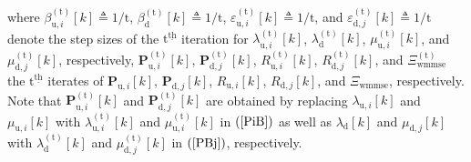 \documentclass[10pt,journal]{IEEEtran}
\newcommand{\paren}[1]{\left({#1}\right)}
\newcommand{\bracket}[1]{{\left [{#1}\right ]}}
\newcommand{\ith}[1]    {{#1}^{\underline{\text{th}}}}
\newcommand{\PiB}{\mathbf{P}_{\textrm{u},i}\bracket{k}}
\newcommand{\PBj}{\mathbf{P}_{\textrm{d},j}\bracket{k}}
\newcommand{\sfrac}[2]{#1/#2}
\theoremstyle{definition}
\begin{document}
where $\beta^{\paren{\mathrm{t}}}_{\textrm{u},i}\bracket{k}\triangleq\sfrac{1}{\mathrm{t}}$, $\beta^{\paren{\mathrm{t}}}_{\textrm{d}}\bracket{k}\triangleq\sfrac{1}{\mathrm{t}}$, $\varepsilon^{\paren{\mathrm{t}}}_{\textrm{u},i}\bracket{k}\triangleq\sfrac{1}{\mathrm{t}}$, and $\varepsilon^{\paren{\mathrm{t}}}_{\textrm{d},j}\bracket{k}\triangleq\sfrac{1}{\mathrm{t}}$ denote the step sizes of the $\ith{\mathrm{t}}$ iteration for $\lambda^{\paren{\mathrm{t}}}_{\textrm{u},i}\bracket{k}$, $\lambda^{\paren{\mathrm{t}}}_{\textrm{d}}\bracket{k}$, $\mu^{\paren{\mathrm{t}}}_{\textrm{u},i}\bracket{k}$, and $\mu^{\paren{\mathrm{t}}}_{\textrm{d},j}\bracket{k}$, respectively, $\mathbf{P}^{\paren{\mathrm{t}}}_{\textrm{u},i}\bracket{k}$, $\mathbf{P}^{\paren{\mathrm{t}}}_{\textrm{d},j}\bracket{k}$, $\mathit{R}^{\paren{\mathrm{t}}}_{\textrm{u},i}\bracket{k}$, $\mathit{R}^{\paren{\mathrm{t}}}_{\textrm{d},j}\bracket{k}$, and $\Xi^{\paren{\mathrm{t}}}_{\textrm{wmmse}}$ the $\ith{\mathrm{t}}$ iterates of $\PiB$, $\PBj$, $\mathit{R}_{\textrm{u},i}\bracket{k}$, $\mathit{R}_{\textrm{d},j}\bracket{k}$, and $\Xi_{\textrm{wmmse}}$, respectively. Note that $\mathbf{P}^{\paren{\mathrm{t}}}_{\textrm{u},i}\bracket{k}$ and $\mathbf{P}^{\paren{\mathrm{t}}}_{\textrm{d},j}\bracket{k}$ are obtained by replacing $\lambda_{\textrm{u},i}\bracket{k}$ and $\mu_{\textrm{u},i}\bracket{k}$ with $\lambda^{\paren{\mathrm{t}}}_{\textrm{u},i}\bracket{k}$ and $\mu^{\paren{\mathrm{t}}}_{\textrm{u},i}\bracket{k}$ in $\paren{\mathrm{\ref{PiB}}}$ as well as $\lambda_{\textrm{d}}\bracket{k}$ and $\mu_{\textrm{d},j}\bracket{k}$ with $\lambda^{\paren{\mathrm{t}}}_{\textrm{d}}\bracket{k}$ and $\mu^{\paren{\mathrm{t}}}_{\textrm{d},j}\bracket{k}$ in $\paren{\mathrm{\ref{PBj}}}$, respectively. %
\end{document}

